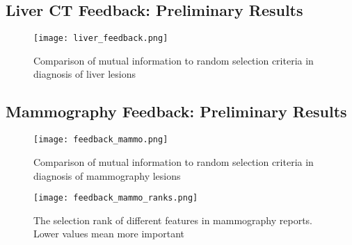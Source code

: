 \subsection{Liver CT Feedback: Preliminary Results}

\begin{figure}[h]
\centering
\texttt{[image: liver\_feedback.png]}
\caption{Comparison of mutual information to random selection criteria in diagnosis of liver lesions}
\label{fig:liver_feedback}
\end{figure}

\subsection{Mammography Feedback: Preliminary Results}

\begin{figure}[h]
	\centering
	\texttt{[image: feedback\_mammo.png]}
	\caption{Comparison of mutual information to random selection criteria in diagnosis of mammography lesions}
	\label{fig:feedback_mammo}
\end{figure}


\begin{figure}[h]
	\centering
	\texttt{[image: feedback\_mammo\_ranks.png]}
	\caption{The selection rank of different features in mammography reports. Lower values mean more important}
	\label{fig:feedback_mammo_ranks}
\end{figure}